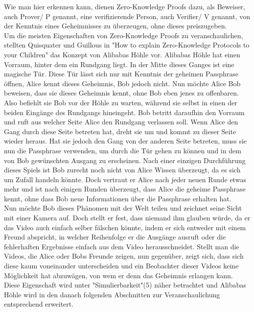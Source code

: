 \documentclass {article}
\begin{document}
Wie man hier erkennen kann, dienen Zero-Knowledge Proofs dazu, als Beweiser, auch Prover/ P genannt, eine
verifizierende Person, auch Verifier/ V genannt, von der Kenntnis eines Geheimnisses zu überzeugen, ohne dieses preiszugeben. \\ 

Um die meisten Eigenschaften von Zero-Knowledge Proofs zu veranschaulichen, stellten Quisquater und Guillous in "How to explain Zero-Knowledge Protocols to your Children"\cite{GQ89} das Konzept von Alibabas H\"ohle vor.
Alibabas H\"ohle hat einen Vorraum, hinter dem ein Rundgang liegt. In der Mitte dieses Ganges ist eine magische T\"ur. Diese T\"ur l\"asst sich nur mit Kenntnis der geheimen Passphrase \"offnen,
Alice kennt dieses Geheimnis, Bob jedoch nicht.
Nun m\"ochte Alice Bob beweisen, dass sie dieses Geheimnis kennt, ohne Bob eben jenes zu offenbaren. Also befiehlt sie Bob vor der H\"ohle zu warten, w\"ahrend sie selbst in einen der beiden Eing\"ange des Rundgangs hineingeht. Bob betritt daraufhin den Vorraum und ruft aus welcher Seite Alice den Rundgang verlassen soll. Wenn Alice den Gang durch diese Seite betreten hat, dreht sie um und kommt zu dieser Seite wieder heraus. Hat sie jedoch den Gang von der anderen Seite betreten, muss sie nun die Passphrase verwenden, um durch die T\"ur gehen zu k\"onnen und in dem von Bob gewünschten Ausgang zu erscheinen. Nach einer einzigen Durchf\"uhrung dieses Spiels ist Bob zurecht noch nicht von Alice Wissen \"uberzeugt, da es sich um Zufall handeln k\"onnte. Doch vertraut er Alice nach jeder neuen Runde etwas mehr und ist nach einigen Runden \"uberzeugt, dass Alice die geheime Passphrase kennt, ohne dass Bob neue Informationen \"uber die Passphrase erhalten hat. \\ 

Nun m\"ochte Bob dieses Ph\"anomen mit der Welt teilen und zeichnet seine Sicht mit einer Kamera auf. Doch stellt er fest, dass niemand ihm glauben würde, da er das Video auch einfach selber f\"alschen k\"onnte, indem er sich entweder mit einem Freund abspricht, in welcher Reihenfolge er die Ausg\"ange ausruft oder die fehlerhaften Ergebnisse einfach aus dem Video herausschneidet. 
Stellt man die Videos, die Alice oder Bobs Freunde zeigen, nun gegen\"uber, zeigt sich, dass sich diese kaum voneinander unterscheiden und ein Beobachter dieser Videos keine M\"oglichkeit hat abzuw\"agen, von wem er denn das Geheimnis erlangen kann.
Diese Eigenschaft wird unter "Simulierbarkeit"(5) n\"aher betrachtet und Alibabas H\"ohle wird in den danach folgenden Abschnitten zur Veranschaulichung entsprechend erweitert.
\end{document}
